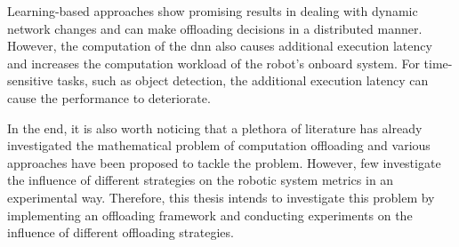 Learning-based approaches show promising results in dealing with dynamic network changes and can make offloading decisions in a distributed manner. However, the computation of the \gls{dnn} also causes additional execution latency and increases the computation workload of the robot's onboard system. For time-sensitive tasks, such as object detection, the additional execution latency can cause the performance to deteriorate.

In the end, it is also worth noticing that a plethora of literature has already investigated the mathematical problem of computation offloading and various approaches have been proposed to tackle the problem. However, few investigate the influence of different strategies on the robotic system metrics in an experimental way. Therefore, this thesis intends to investigate this problem by implementing an offloading framework and conducting experiments on the influence of different offloading strategies. 